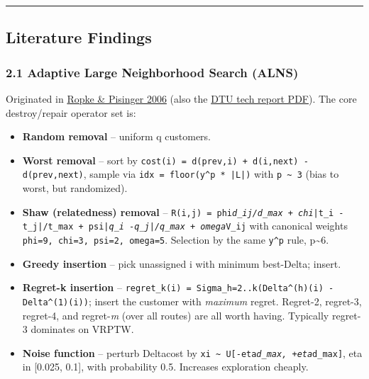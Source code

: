 \documentclass[twocolumn,10pt,letterpaper]{article}
\begin{document}
\vspace{0.5em}
\noindent\rule{\columnwidth}{0.4pt}
\vspace{0.5em}

\subsection{Literature Findings}

\subsubsection{2.1 Adaptive Large Neighborhood Search (ALNS)}

Originated in \href{https://www.sciencedirect.com/science/article/abs/pii/S0305054805003023}{Ropke \& Pisinger 2006} (also the \href{https://backend.orbit.dtu.dk/ws/portalfiles/portal/3154899/An\%20adaptive\%20large\%20neighborhood\%20search\%20heuristic\%20for\%20the\%20pickup\%20and\%20delivery\%20problem\%20with\%20time\%20windows\_TechRep\_ropke\_pisinger.pdf}{DTU tech report PDF}). The core destroy/repair operator set is:


\begin{itemize}
\setlength{\itemsep}{0pt}
\setlength{\parskip}{0pt}
  \item \textbf{Random removal} -- uniform q customers.
  \item \textbf{Worst removal} -- sort by \texttt{cost(i) = d(prev,i) + d(i,next) -\allowbreak  d(prev,next)}, sample via \texttt{idx = floor(y\^{}p * |L|)} with \texttt{p \textasciitilde{} 3} (bias to worst, but randomized).
  \item \textbf{Shaw (relatedness) removal} -- \texttt{R(i,j) = phi\textit{d\_ij/\allowbreak d\_max + chi}|t\_i -\allowbreak  t\_j|/\allowbreak t\_max + psi\textit{|q\_i -\allowbreak  q\_j|/\allowbreak q\_max + omega}V\_ij} with canonical weights \texttt{phi=9, chi=3, psi=2, omega=5}. Selection by the same \texttt{y\^{}p} rule, p\textasciitilde{}6.
  \item \textbf{Greedy insertion} -- pick unassigned i with minimum best-Delta; insert.
  \item \textbf{Regret-k insertion} -- \texttt{regret\_k(i) = Sigma\_{h=2..k}(Delta\^{}(h)(i) -\allowbreak  Delta\^{}(1)(i))}; insert the customer with \textit{maximum} regret. Regret-2, regret-3, regret-4, and regret-\textit{m} (over all routes) are all worth having. Typically regret-3 dominates on VRPTW.
  \item \textbf{Noise function} -- perturb Deltacost by \texttt{xi \textasciitilde{} U[-\allowbreak eta\textit{d\_max, +eta}d\_max]}, eta in [0.025, 0.1], with probability 0.5. Increases exploration cheaply.
\end{itemize}
\end{document}
